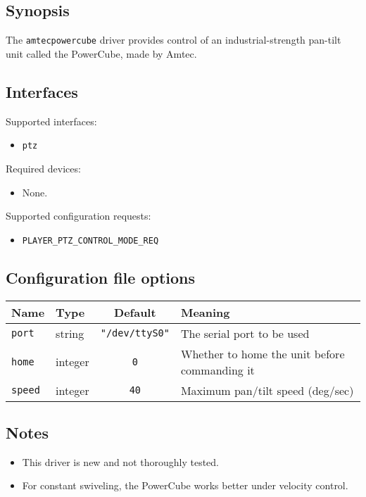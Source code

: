 \subsection*{Synopsis}
The {\tt amtecpowercube} driver provides control of an industrial-strength
pan-tilt unit called the PowerCube, made by Amtec.

\subsection*{Interfaces}

\noindent Supported interfaces:
\begin{itemize}
\item {\tt ptz}
\end{itemize}

\noindent Required devices:
\begin{itemize}
\item None.
\end{itemize}

\noindent Supported configuration requests:
\begin{itemize}
\item {\tt PLAYER\_PTZ\_CONTROL\_MODE\_REQ}
\end{itemize}

\subsection*{Configuration file options}

\begin{center}
{\small \begin{tabularx}{\columnwidth}{|l|l|c|X|}
\hline
Name & Type & Default & Meaning\\
\hline
{\tt port} & string & {\tt "/dev/ttyS0"} & The serial port to be used\\
{\tt home} & integer & {\tt 0} & Whether to home the unit before commanding it\\
{\tt speed} & integer & {\tt 40} & Maximum pan/tilt speed (deg/sec)\\
\hline
\end{tabularx}}
\end{center}

\subsection*{Notes}
\begin{itemize}
\item This driver is new and not thoroughly tested.
\item For constant swiveling, the PowerCube works better under velocity
control.
\end{itemize}

